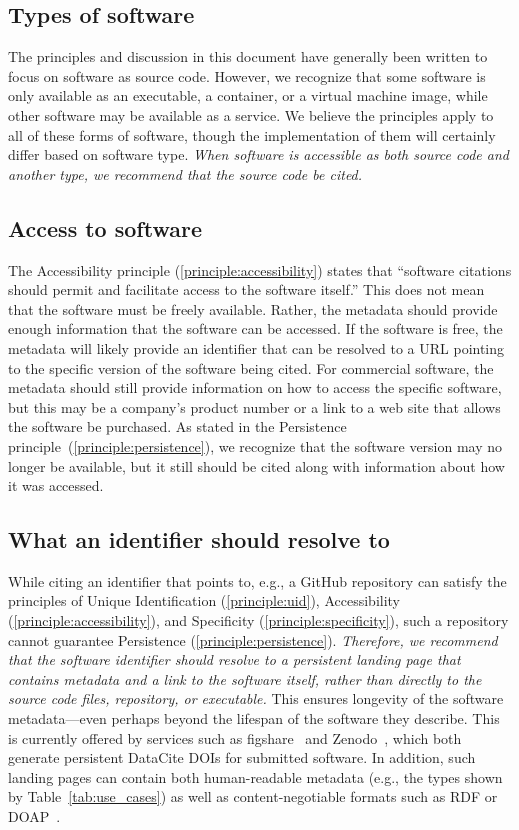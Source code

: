 \documentclass[12pt, oneside]{amsart}
\begin{document}
\subsection{Types of software}

The principles and discussion in this document have generally been written to focus on software
as source code.  However, we recognize that some software is only available as an executable, a container, or a virtual machine image, while other software may be available as a service.  We believe the principles apply to all of these forms of software, though the implementation of them will certainly differ based on software type.
\textit{When software is accessible as both source code and another type, we recommend that the source code be cited.}


\subsection{Access to software}
\label{sec:access}

The Accessibility principle (\ref{principle:accessibility}) states that ``software citations should permit and facilitate access to the software itself.''
This does not mean that the software must be freely available.
Rather, the metadata should provide enough information that the software can be accessed.
If the software is free, the metadata will likely provide an identifier that can be resolved to a URL pointing to the specific version of the software being cited.
For commercial software, the metadata should still provide information on how to access the specific software, but this may be a company's product number or a link to a web site that allows the software be purchased.
As stated in the Persistence principle~(\ref{principle:persistence}), we recognize that the software version may no longer be available, but it still should be cited along with information about how it was accessed.

\subsection{What an identifier should resolve to}

While citing an identifier that points to, e.g., a GitHub repository can satisfy the principles of Unique Identification (\ref{principle:uid}), Accessibility (\ref{principle:accessibility}), and Specificity (\ref{principle:specificity}), such a repository cannot guarantee Persistence (\ref{principle:persistence}).
\textit{Therefore, we recommend that the software identifier should resolve to a persistent landing page that contains metadata and a link to the software itself, rather than directly to the source code files, repository, or executable.}
This ensures longevity of the software metadata---even perhaps beyond the lifespan of the software they describe.
This is currently offered by services such as figshare~\cite{figshare} and Zenodo~\cite{github-citable-code-guide}, which both generate persistent DataCite DOIs for submitted software.
In addition, such landing pages can contain both human-readable metadata (e.g., the types shown by Table~\ref{tab:use_cases}) as well as content-negotiable formats such as RDF or DOAP~\cite{DOAP}.
\end{document}
